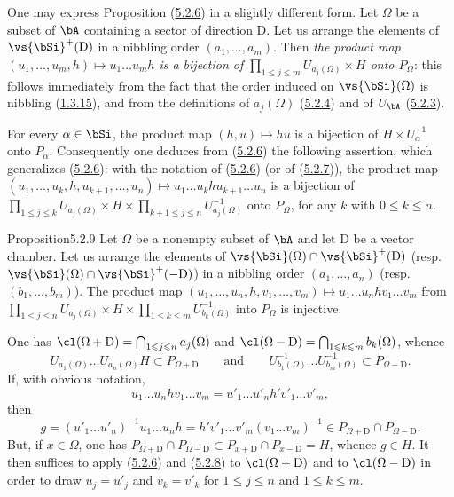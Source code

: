 \documentclass[12pt,a4paper,oneside,english]{smfart}
\makeatletter
\newcommand{\btanchor}[1]{\leavevmode\Hy@raisedlink{\hypertarget{bt:#1}{}}}
\newcommand{\btref}[1]{\hyperlink{bt:#1}{#1}}
\theoremstyle{definition}
\theoremstyle{bt}
\makeatother
\begin{document}
\btanchor{5.2.7}
One may express Proposition (\btref{5.2.6}) in a slightly different form. Let $\Omega$
be a subset of $\bA$ containing a sector of direction $\mathrm{D}$. Let us
arrange the elements of $\vs{\bSi}^{+}(\mathrm{D})$ in a nibbling order
$(a_{1},\dots,a_{m})$. Then \emph{the product map
$(u_{1},\dots,u_{m},h)\mapsto u_{1}\dots u_{m}h$ is a bijection of
$\prod_{1\leqslant j\leqslant m}U_{a_{j}(\Omega)}\times H$ onto $P_{\Omega}$}:
this follows immediately from the fact that the order induced on
$\vs{\bSi}(\Omega)$ is nibbling (\btref{1.3.15}), and from the definitions of
$a_{j}(\Omega)$ (\btref{5.2.4}) and of $U_{\bA}$ (\btref{5.2.3}).

\btanchor{5.2.8}
For every $\alpha\in\bSi$, the product map $(h,u)\mapsto hu$ is a bijection of
$H\times U_{\alpha}^{-1}$ onto $P_{\alpha}$. Consequently one deduces from
(\btref{5.2.6}) the following assertion, which generalizes (\btref{5.2.6}): with the notation of
(\btref{5.2.6}) (or of (\btref{5.2.7})), the product map
$(u_{1},\dots,u_{k},h,u_{k+1},\dots,u_{n})\mapsto u_{1}\dots u_{k}hu_{k+1}\dots u_{n}$
is a bijection of
$\prod_{1\leqslant j\leqslant k}U_{a_{j}(\Omega)}\times H\times
\prod_{k+1\leqslant j\leqslant n}U^{-1}_{a_{j}(\Omega)}$ onto $P_{\Omega}$, for
any $k$ with $0\leqslant k\leqslant n$.

\begin{btstat}{Proposition}{5.2.9}\btanchor{5.2.9}
Let $\Omega$ be a nonempty subset of $\bA$ and let $\mathrm{D}$ be a vector
chamber. Let us arrange the elements of
$\vs{\bSi}(\Omega)\cap\vs{\bSi}^{+}(\mathrm{D})$ (resp.\
$\vs{\bSi}(\Omega)\cap\vs{\bSi}^{+}(-\mathrm{D})$) in a nibbling order
$(a_{1},\dots,a_{n})$ (resp.\ $(b_{1},\dots,b_{m})$). The product map
$(u_{1},\dots,u_{n},h,v_{1},\dots,v_{m})\mapsto u_{1}\dots u_{n}hv_{1}\dots v_{m}$
from $\prod_{1\leqslant j\leqslant n}U_{a_{j}(\Omega)}\times H\times
\prod_{1\leqslant k\leqslant m}U^{-1}_{b_{k}(\Omega)}$ into $P_{\Omega}$ is
injective.
\end{btstat}

One has $\cl(\Omega+\mathrm{D})=\bigcap_{1\leqslant j\leqslant n}a_{j}(\Omega)$
and $\cl(\Omega-\mathrm{D})=\bigcap_{1\leqslant k\leqslant m}b_{k}(\Omega)$,
whence
\[
U_{a_{1}(\Omega)}\dots U_{a_{n}(\Omega)}H\subset P_{\Omega+\mathrm{D}}
\qquad\text{and}\qquad
U^{-1}_{b_{1}(\Omega)}\dots U^{-1}_{b_{m}(\Omega)}\subset P_{\Omega-\mathrm{D}}.
\]
If, with obvious notation,
\[
u_{1}\dots u_{n}hv_{1}\dots v_{m}=u'_{1}\dots u'_{n}h'v'_{1}\dots v'_{m},
\]
then
\[
g=(u'_{1}\dots u'_{n})^{-1}u_{1}\dots u_{n}h =h'v'_{1}\dots v'_{m}(v_{1}\dots v_{m})^{-1}
\in P_{\Omega+\mathrm{D}}\cap P_{\Omega-\mathrm{D}}.
\]
But, if $x\in\Omega$, one has
$P_{\Omega+\mathrm{D}}\cap P_{\Omega-\mathrm{D}}\subset
P_{x+\mathrm{D}}\cap P_{x-\mathrm{D}}=H$, whence $g\in H$. It then suffices to
apply (\btref{5.2.6}) and (\btref{5.2.8}) to $\cl(\Omega+\mathrm{D})$ and to
$\cl(\Omega-\mathrm{D})$ in order to draw $u_{j}=u'_{j}$ and $v_{k}=v'_{k}$ for
$1\leqslant j\leqslant n$ and $1\leqslant k\leqslant m$.
\end{document}
